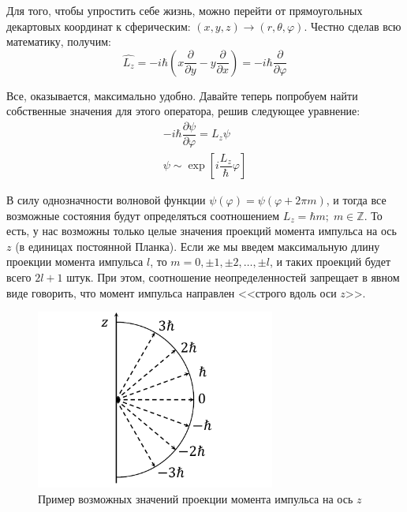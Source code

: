 \documentclass[12pt]{article}
\begin{document}
\vspace{1em} \noindent
Для того, чтобы упростить себе жизнь, можно перейти от прямоугольных декартовых координат к сферическим: $(x,y,z) \rightarrow (r, \theta, \varphi)$. Честно сделав всю математику, получим:
\begin{equation}
    \hat{L_z} = -i\hbar\left(x\dfrac{\partial}{\partial y} - y\dfrac{\partial}{\partial x}\right)= -i\hbar\dfrac{\partial}{\partial \varphi}
\end{equation}

\vspace{1em} \noindent
Все, оказывается, максимально удобно. Давайте теперь попробуем найти собственные значения для этого оператора, решив следующее уравнение:
\begin{gather*}
     -i\hbar\dfrac{\partial \psi}{\partial \varphi} = L_z \psi\\
     \psi \sim \exp{\left[i\dfrac{L_z}{\hbar} \varphi \right]}
\end{gather*}

\vspace{1em} \noindent
В силу однозначности волновой функции $\psi(\varphi) = \psi(\varphi + 2\pi m)$, и тогда все возможные состояния будут определяться соотношением $L_z =\hbar m;\; m \in \mathbb{Z}$. То есть, у нас возможны только целые значения проекций момента импульса на ось $z$ (в единицах постоянной Планка). Если же мы введем максимальную длину проекции момента  импульса $l$, то $m = 0, \pm 1, \pm 2, \dots, \pm l$, и таких проекций будет всего $2l+1$ штук. При этом, соотношение неопределенностей запрещает в явном виде говорить, что момент импульса направлен <<строго вдоль оси $z$>>.

\begin{figure}[h]
    \centering
    \includegraphics[width=0.7\textwidth,height=\textheight,keepaspectratio]{Seminar_06/pics/pic_01.pdf}
    \caption{Пример возможных значений проекции момента импульса на ось $z$}
    \label{fig:sem_06_momet_projection}
\end{figure}
\end{document}
